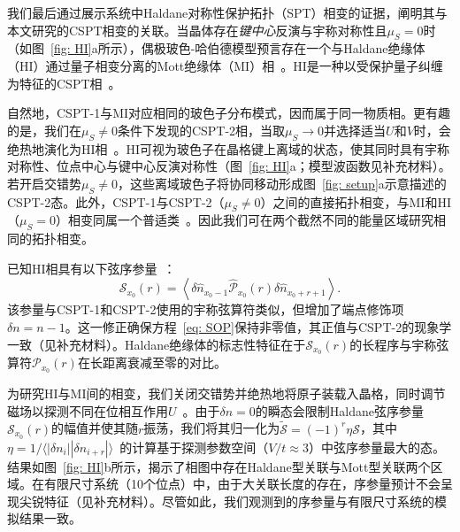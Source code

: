 \documentclass[preprint,superscriptaddress,floatfix, nofootinbib]{revtex4-2}
\begin{document}
\begin{CJK*}{UTF8}{gbsn}
我们最后通过展示系统中Haldane对称性保护拓扑（SPT）相变的证据，阐明其与本文研究的CSPT相变的关联。当晶体存在\textit{键中心}反演与宇称对称性且$\mu_S = 0$时（如图~\ref{fig: HI}a所示），偶极玻色-哈伯德模型预言存在一个与Haldane绝缘体（HI）通过量子相变分离的Mott绝缘体（MI）相~\cite{Haldane1983, Buyers1986, Xu1996, Torre2006}。HI是一种以受保护量子纠缠为特征的CSPT相~\cite{Pollmann2012}。

自然地，CSPT-1与MI对应相同的玻色子分布模式，因而属于同一物质相。更有趣的是，我们在$\mu_S \neq 0$条件下发现的CSPT-2相，当取$\mu_S \to 0$并选择适当$U$和$V$时，会绝热地演化为HI相~\cite{Fuji2015}。HI可视为玻色子在晶格键上离域的状态，使其同时具有宇称对称性、位点中心与键中心反演对称性（图~\ref{fig: HI}a；模型波函数见补充材料）。若开启交错势$\mu_S \neq 0$，这些离域玻色子将协同移动形成图~\ref{fig: setup}a示意描述的CSPT-2态。此外，CSPT-1与CSPT-2（$\mu_S \neq 0$）之间的直接拓扑相变，与MI和HI（$\mu_S = 0$）相变同属一个普适类~\cite{Sahay2025}。因此我们可在两个截然不同的能量区域研究相同的拓扑相变。

已知HI相具有以下弦序参量~\cite{Nijs1989, Pollmann2012Detection}：
\begin{equation}
\label{eq: SOP}
\mathcal{S}_{x_0} (r)=\left\langle\delta \hat n_{x_0 -1} \hat{\mathcal{P}}_{x_0}(r)\delta \hat n_{x_0+r + 1}\right\rangle.
\end{equation}
该参量与CSPT-1和CSPT-2使用的宇称弦算符类似，但增加了端点修饰项$\delta n = n - 1$。这一修正确保方程~\eqref{eq: SOP}保持非零值，其正值与CSPT-2的现象学一致（见补充材料）。Haldane绝缘体的标志性特征在于$\mathcal{S}_{x_0}(r)$的长程序与宇称弦算符$\mathcal{P}_{x_0}(r)$在长距离衰减至零的对比。

为研究HI与MI间的相变，我们关闭交错势并绝热地将原子装载入晶格，同时调节磁场以探测不同在位相互作用$U$~\cite{Patscheider2022}。由于$\delta n = 0$的瞬态会限制Haldane弦序参量$\mathcal{S}_{x_0}(r)$的幅值并使其随$r$振荡，我们将其归一化为$\widetilde{\mathcal{S}} = (-1)^{r}\eta \mathcal{S}$，其中$\eta=1/\langle |\delta n_i||\delta n_{i+r}|\rangle$~\cite{Sompet2022}的计算基于探测参数空间（$V/t \approx 3$）中弦序参量最大的态。结果如图~\ref{fig: HI}b所示，揭示了相图中存在Haldane型关联与Mott型关联两个区域。在有限尺寸系统（10个位点）中，由于大关联长度的存在，序参量预计不会呈现尖锐特征（见补充材料）。尽管如此，我们观测到的序参量与有限尺寸系统的模拟结果一致。


\end{CJK*}
\end{document}

